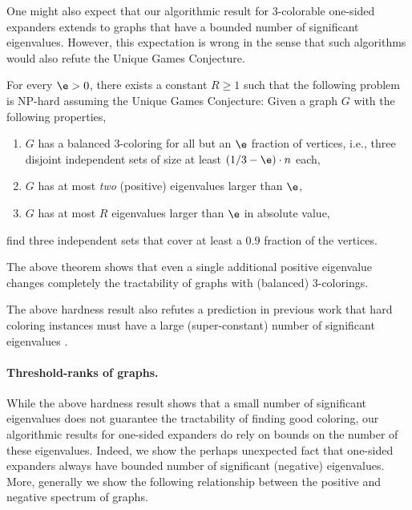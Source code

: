 One might also expect that our algorithmic result for 3-colorable one-sided expanders extends to graphs that have a bounded number of significant eigenvalues.
However, this expectation is wrong in the sense that such algorithms would also refute the Unique Games Conjecture.

\begin{theorem}
  For every \(\e>0\), there exists a constant \(R\ge 1\) such that the following problem is NP-hard assuming the Unique Games Conjecture:
  Given a graph \(G\) with the following properties,
  \begin{enumerate}
  \item \(G\) has a balanced 3-coloring for all but an \(\e\) fraction of vertices, i.e., three disjoint independent sets of size at least \((1/3-\e)\cdot n\) each,
  \item \(G\) has at most \emph{two} (positive) eigenvalues larger than \(\e\),
  \item \(G\) has at most \(R\) eigenvalues larger than \(\e\) in absolute value,
  \end{enumerate}
  find three independent sets that cover at least a \(0.9\) fraction of the vertices.
\end{theorem}

The above theorem shows that even a single additional positive eigenvalue changes completely the tractability of graphs with (balanced) 3-colorings.

The above hardness result also refutes a prediction in previous work that hard coloring instances must have a large (super-constant) number of significant eigenvalues \cite{bafna-hsieh-kothari}.

\paragraph{Threshold-ranks of graphs.}

While the above hardness result shows that a small number of significant eigenvalues does not guarantee the tractability of finding good coloring,
our algorithmic results for one-sided expanders do rely on bounds on the number of these eigenvalues.
Indeed, we show the perhaps unexpected fact that one-sided expanders always have bounded number of significant (negative) eigenvalues.
More, generally we show the following relationship between the positive and negative spectrum of graphs.

